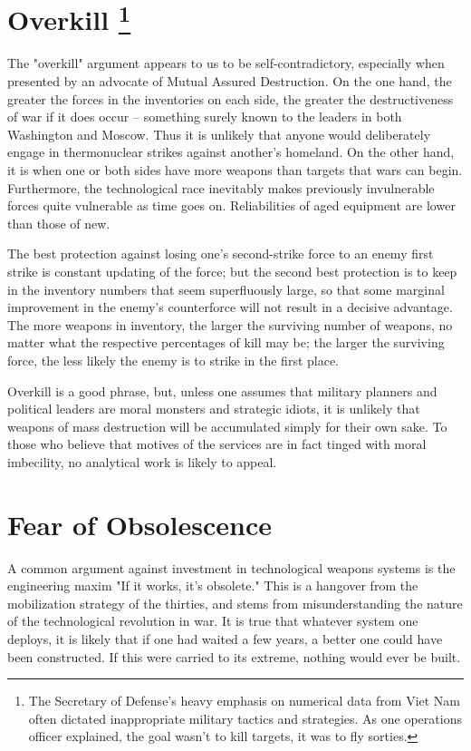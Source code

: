 \section{Overkill
    \footnote{The Secretary of Defense's heavy emphasis on numerical data from Viet Nam often dictated inappropriate military tactics and strategies. As one operations officer explained, the goal wasn't to kill targets, it was to fly sorties.}
}

The "overkill" argument appears to us to be self-contradictory, especially when presented by an advocate of Mutual Assured Destruction. On the one hand, the greater the forces in the inventories on each side, the greater the destructiveness of war if it does occur -- something surely known to the leaders in both Washington and Moscow. Thus it is unlikely that anyone would deliberately engage in thermonuclear strikes against another's homeland. On the other hand, it is when one or both sides have more weapons than targets that wars can begin. Furthermore, the technological race inevitably makes previously invulnerable forces quite vulnerable as time goes on. Reliabilities of aged equipment are lower than those of new.

The best protection against losing one's second-strike force to an enemy first strike is constant updating of the force; but the second best protection is to keep in the inventory numbers that seem superfluously large, so that some marginal improvement in the enemy's counterforce will not result in a decisive advantage. The more weapons in inventory, the larger the surviving number of weapons, no matter what the respective percentages of kill may be; the larger the surviving force, the less likely the enemy is to strike in the first place.

Overkill is a good phrase, but, unless one assumes that military planners and political leaders are moral monsters and strategic idiots, it is unlikely that weapons of mass destruction will be accumulated simply for their own sake. To those who believe that motives of the services are in fact tinged with moral imbecility, no analytical work is likely to appeal.

\section{Fear of Obsolescence}

A common argument against investment in technological weapons systems is the engineering maxim "If it works, it's obsolete." This is a hangover from the mobilization strategy of the thirties, and stems from misunderstanding the nature of the technological revolution in war. It is true that whatever system one deploys, it is likely that if one had waited a few years, a better one could have been constructed. If this were carried to its extreme, nothing would ever be built.

